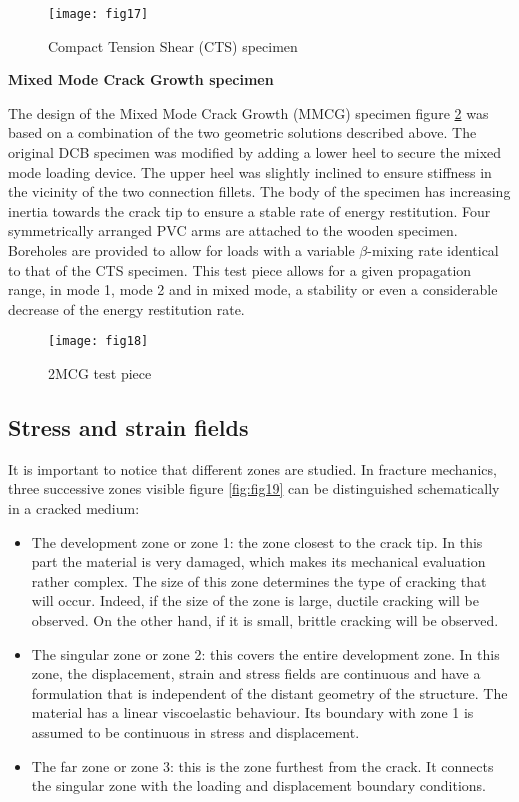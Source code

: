 \begin{figure}[tp]
	\centering
	\texttt{[image: fig17]}
	\caption{Compact Tension Shear (CTS) specimen}
	\label{fig:fig17}
\end{figure}

\textbf{Mixed Mode Crack Growth specimen}

The design of the Mixed Mode Crack Growth (MMCG) specimen figure \ref{fig:fig18} was based on a combination of the two geometric solutions described above. The original DCB specimen was modified by adding a lower heel to secure the mixed mode loading device. The upper heel was slightly inclined to ensure stiffness in the vicinity of the two connection fillets. The body of the specimen has increasing inertia towards the crack tip to ensure a stable rate of energy restitution. Four symmetrically arranged PVC arms are attached to the wooden specimen. Boreholes are provided to allow for loads with a variable $\beta$-mixing rate identical to that of the CTS specimen. This test piece allows for a given propagation range, in mode 1, mode 2 and in mixed mode, a stability or even a considerable decrease of the energy restitution rate\cite{MoutouPitti2008}.





\begin{figure}[tp]
	\centering
	\texttt{[image: fig18]}
	\caption{2MCG test piece \cite{MoutouPitti2008}}
	\label{fig:fig18}
\end{figure}

\subsection{Stress and strain fields}

It is important to notice that different zones are studied. In fracture mechanics, three successive zones visible figure \ref{fig:fig19} can be distinguished schematically in a cracked medium:

\begin{itemize}
	\item The development zone or zone 1: the zone closest to the crack tip. In this part the material is very damaged, which makes its mechanical evaluation rather complex. The size of this zone determines the type of cracking that will occur. Indeed, if the size of the zone is large, ductile cracking will be observed. On the other hand, if it is small, brittle cracking will be observed.
	\item The singular zone or zone 2: this covers the entire development zone. In this zone, the displacement, strain and stress fields are continuous and have a formulation that is independent of the distant geometry of the structure. The material has a linear viscoelastic behaviour. Its boundary with zone 1 is assumed to be continuous in stress and displacement.
	\item The far zone or zone 3: this is the zone furthest from the crack. It connects the singular zone with the loading and displacement boundary conditions.
\end{itemize}


